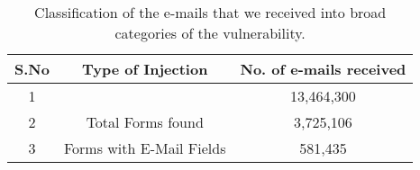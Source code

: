 \begin{table}[!htbp]
	\centering
	\begin{tabular}{|c|c|c|}
		\hline
		\multicolumn{1}{|c|}{\textbf{S.No}} &
		\multicolumn{1}{c|}{\textbf{Type of Injection}} &
		\multicolumn{1}{c|}{\textbf{No. of e-mails received}}\\
		\hline
		1 &  & 13,464,300\\
		\hline
		2 & Total Forms found & 3,725,106\\
		\hline
		3 & Forms with E-Mail Fields & 581,435\\
		\hline
	\end{tabular}
	\caption[Analysis of the data]{Classification of the e-mails that we received into broad categories of the vulnerability.}
	\label{tab:analysis}
\end{table}